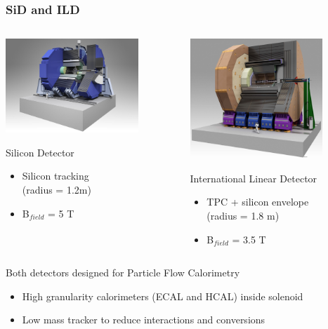 \documentclass{beamer}
\begin{document}
\begin{frame}
  \frametitle{SiD and ILD}

  \vspace{-0.12cm}
  \begin{columns}[t]
    \begin{column}{5cm}
      \includegraphics[width = 5cm, height = 2.9 cm]{Pictures/ILC_SiD.jpg}
      \vspace{-0.25cm}
      \begin{block}{Silicon Detector}
        \footnotesize{
        \begin{itemize}
          \item Silicon tracking \\ (radius = 1.2m)
          \item B$_{field}$ = 5 T
        \end{itemize}
        }
      \end{block}
    \end{column}

    \begin{column}{5cm}
      \includegraphics[width = 5cm, height = 2.9 cm]{Pictures/ILD_all_110826.jpg}
      \vspace{-0.25cm}
      \begin{block}{International Linear Detector}
        \footnotesize{
        \begin{itemize}
          \item TPC + silicon envelope \\ (radius = 1.8 m)
          \item B$_{field}$ = 3.5 T
        \end{itemize}
        }
      \end{block}
    \end{column}
  \end{columns}

  \vspace{-0.2cm}
  \begin{block}{Both detectors designed for Particle Flow Calorimetry}
    \footnotesize{
    \begin{itemize}
      \item High granularity calorimeters (ECAL and HCAL) inside solenoid
        \vspace{-0.1cm}
      \item Low mass tracker to reduce interactions and conversions
    \end{itemize}
    }
  \end{block}
  
\end{frame}
  
\end{document}
